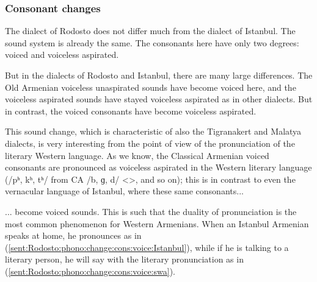 \subsubsection{Consonant changes}
\label{section:Rodosto:Phono:SoundChange:Laryngeal}
The dialect of Rodosto does not differ much from the dialect of Istanbul. The sound system is already the same. The consonants here have only two degrees: voiced and voiceless aspirated. 

But in the dialects of Rodosto and Istanbul, there are many large differences. The Old Armenian voiceless unaspirated sounds have become voiced here, and the voiceless aspirated sounds have stayed voiceless aspirated as in other dialects. But in contrast, the voiced consonants have become voiceless aspirated. 


This sound change, which is characteristic of also the Tigranakert and Malatya dialects, is very interesting from the point of view of the pronunciation of the literary Western language. As we know, the Classical Armenian voiced consonants are pronounced as voiceless aspirated in the Western literary language (/pʰ, kʰ, tʰ/ from CA /b, ɡ, d/ <>, and so on); this is in contrast to even the vernacular language of Istanbul, where these same consonants... 



\begin{adjarianpage}\label{page:259}\end{adjarianpage}%

... become voiced sounds. This is such that the duality of pronunciation is the most common phenomenon for Western Armenians. When an Istanbul Armenian speaks at home, he pronounces as in (\ref{sent:Rodosto:phono:change:cons:voice:Istanbul}), while if he is talking to a literary person, he will say with the literary pronunciation as in (\ref{sent:Rodosto:phono:change:cons:voice:swa}).

